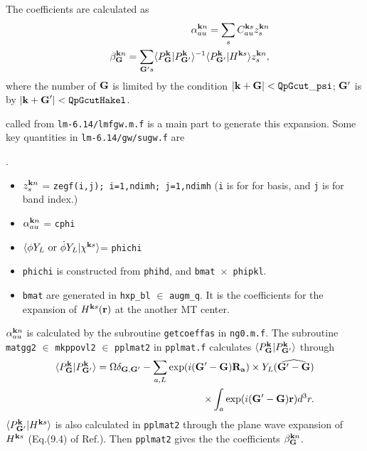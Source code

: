 \documentclass[a4paper,10pt,epsf,fleqn]{article}
\begin{document}
The coefficients are calculated as
\begin{eqnarray}
&&\alpha^{{\bf k} n}_{au} = \sum_s C^{{\bf k}s}_{a u} z^{{\bf k}n}_s \\
&&\beta^{{\bf k}n}_{\bf G} = \sum_{{\bf G}'s} 
\langle P^{\bf k}_{\bf G}|P^{\bf k}_{{\bf G}'}\rangle^{-1}
\langle P^{\bf k}_{{\bf G}'}|H^{{\bf k}s}\rangle z^{{\bf k}n}_s,
\end{eqnarray}
where the number of ${\bf G}$ is limited by the condition
$|{\bf k+G}|< {\tt QpGcut\_psi}$;
${\bf G}'$ is by $|{\bf k+G}'|< {\tt  QpGcutHakel}$.

\vspace{8mm}
 called from 
{\tt lm-6.14/lmfgw.m.f} is a main part to generate this expansion.
Some key quantities in {\tt lm-6.14/gw/sugw.f} are

.
\begin{itemize}
\item 
$z^{{\bf k}n}_s$ = {\tt zegf(i,j); i=1,ndimh; {\tt j=1,ndimh}} 
({\tt i} is for for basis, and {\tt j} is for band index.)
	
\item 
$\alpha^{{\bf k} n}_{au}$ = {\tt cphi}

\item
$\langle \phi Y_L {\ \rm or \ } \dot{\phi}Y_L|\chi^{{\bf k}s} \rangle$= {\tt phichi} 
	
\item 
{\tt phichi} is constructed from {\tt phihd}, and {\tt bmat $\times$ phipkl}.

\item 
{\tt bmat} are generated in {\tt hxp\_bl} $\in$ {\tt augm\_q}.
It is the coefficients for the expansion of $H^{{\bf k}s}({\bf r})$ 
at the another MT center.

\end{itemize}


\noindent [ In {\tt ng0.m.f}, ${\tt QpGcutHakel}$ is assumed as $={\tt 1.5*QpGcut\_psi}$ now.
{\underline But it is not justified enough.}
You will be able to utilize more reasonable ones
which was used in the LDA calculations.]

\noindent $\alpha^{{\bf k} n}_{au}$ is calculated by the subroutine {\tt getcoeffas} in 
{\tt ng0.m.f}.
The subroutine {\tt matgg2} $\in$ {\tt mkppovl2} $\in$ {\tt pplmat2} in {\tt pplmat.f} calculates
$\langle P^{\bf k}_{\bf G}|P^{\bf k}_{{\bf G}'} \rangle$ through
\begin{eqnarray}
\langle P^{\bf k}_{\bf G}|P^{\bf k}_{{\bf G}'} \rangle
= \Omega \delta_{{\bf G},{\bf G}'} -  
\sum_{a,L} \exp( i ({\bf G}'-{\bf G}) {\bf R_a}) 
\times Y_L(\widehat{{\bf G}'-{\bf G}}) \nonumber \\
\times \int_{a} \exp(i({\bf G}'-{\bf G}){\bf r}) d^3r.
\end{eqnarray}
$\langle P^{\bf k}_{{\bf G}'}| H^{{\bf k}s} \rangle$ is also calculated
in {\tt pplmat2} through the plane wave expansion of $H^{{\bf k}s}$
(Eq.(9.4) of Ref.\cite{bott98}). Then {\tt pplmat2} gives the
the coefficients $\beta^{{\bf k}n}_{\bf G}$.
\end{document}
